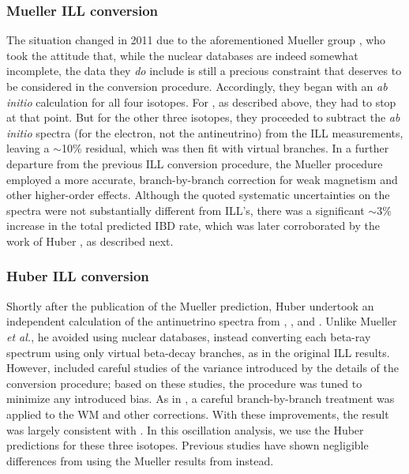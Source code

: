 \documentclass[../thesis.tex]{subfiles}
\begin{document}
\subsubsection{Mueller ILL conversion}
\label{sec:frenchconv}

The situation changed in 2011 due to the aforementioned Mueller group \cite{PhysRevC.83.054615}, who took the attitude that, while the nuclear databases are indeed somewhat incomplete, the data they \emph{do} include is still a precious constraint that deserves to be considered in the conversion procedure. Accordingly, they began with an \emph{ab initio} calculation for all four isotopes. For \ureight, as described above, they had to stop at that point. But for the other three isotopes, they proceeded to subtract the \emph{ab initio} spectra (for the electron, not the antineutrino) from the ILL measurements, leaving a $\sim$10\% residual, which was then fit with virtual branches. In a further departure from the previous ILL conversion procedure, the Mueller procedure employed a more accurate, branch-by-branch correction for weak magnetism and other higher-order effects. Although the quoted systematic uncertainties on the spectra were not substantially different from ILL's, there was a significant $\sim$3\% increase in the total predicted IBD rate, which was later corroborated by the work of Huber \cite{PhysRevC.84.024617}, as described next.

\subsubsection{Huber ILL conversion}
\label{sec:huberconv}

Shortly after the publication of the Mueller prediction, Huber undertook an independent calculation of the antinuetrino spectra from \urfive, \punine, and \puone \cite{PhysRevC.84.024617}. Unlike Mueller \emph{et al.}, he avoided using nuclear databases, instead converting each beta-ray spectrum using only virtual beta-decay branches, as in the original ILL results. However, \cite{PhysRevC.84.024617} included careful studies of the variance introduced by the details of the conversion procedure; based on these studies, the procedure was tuned to minimize any introduced bias. As in \cite{PhysRevC.83.054615}, a careful branch-by-branch treatment was applied to the WM and other corrections. With these improvements, the result was largely consistent with \cite{PhysRevC.83.054615}. In this oscillation analysis, we use the Huber predictions for these three isotopes. Previous studies have shown negligible differences from using the Mueller results from \cite{PhysRevC.83.054615} instead.
\end{document}
